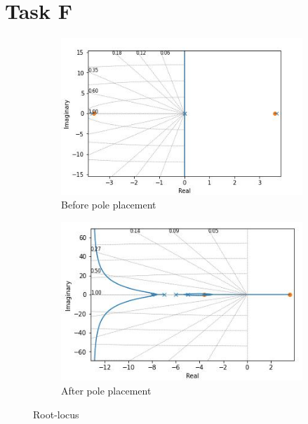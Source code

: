 \documentclass[12pt,letterpaper]{article}
\begin{document}
\section*{Task F}
\label{Q:F}
     \begin{figure}[htb]
        \begin{subfigure}{.5\textwidth}
            \centering
            \includegraphics[width=1\linewidth]{images/output/rlocus.jpg}
            \caption{Before pole placement}
            \label{fig:rlocus_before}
        \end{subfigure}
        \begin{subfigure}{.5\textwidth}
          \centering
          \includegraphics[width=1\linewidth]{images/output/rlocus_tune.jpg}
          \caption{After pole placement}
        \label{fig:rlocus_after}
        \end{subfigure}
    \caption{Root-locus}
    \label{fig:rlocus}
    \end{figure}
        
\end{document}
